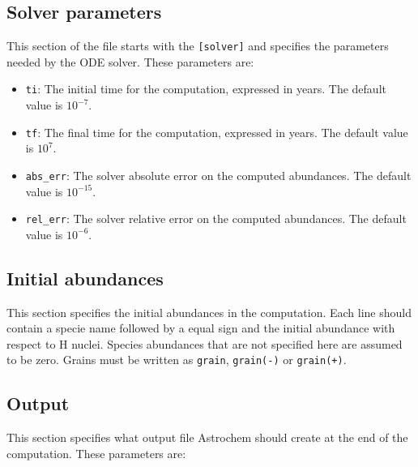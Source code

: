 \documentclass[a4paper,12pt]{article}
\begin{document}
{\begin{itemize}
\end{itemize}

\subsection{Solver parameters}
\label{sec:solver-parameters}

This section of the file starts with the \verb=[solver]= and specifies
the parameters needed by the ODE solver. These parameters are:

\begin{itemize}

\item \verb=ti=: The initial time for the computation, expressed in
  years. The default value is $10^{-7}$.

\item \verb=tf=: The final time for the computation, expressed in
  years. The default value is $10^{7}$.

\item \verb=abs_err=: The solver absolute error on the computed
  abundances. The default value is $10^{-15}$.

\item \verb=rel_err=: The solver relative error on the computed
  abundances. The default value is $10^{-6}$.

\end{itemize}

\subsection{Initial abundances}
\label{sec:initial-abundances}

This section specifies the initial abundances in the computation. Each
line should contain a specie name followed by a equal sign and the
initial abundance with respect to H nuclei. Species abundances that
are not specified here are assumed to be zero. Grains must be written
as \verb=grain=, \verb=grain(-)= or \verb=grain(+)=.

\subsection{Output}
\label{sec:output}

This section specifies what output file Astrochem should create at the
end of the computation. These parameters are:

\begin{itemize}


\end{itemize}}
\end{document}
